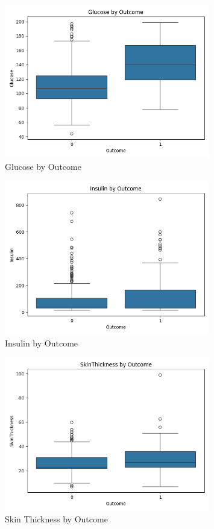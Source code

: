 \documentclass[12pt,a4paper]{article}
\begin{document}
\begin{figure}[H]
\centering
\includegraphics[width=0.8\textwidth]{../plots/boxplot_Glucose.png}
\caption{Glucose by Outcome}
\end{figure}

\begin{figure}[H]
\centering
\includegraphics[width=0.8\textwidth]{../plots/boxplot_Insulin.png}
\caption{Insulin by Outcome}
\end{figure}

\begin{figure}[H]
\centering
\includegraphics[width=0.8\textwidth]{../plots/boxplot_SkinThickness.png}
\caption{Skin Thickness by Outcome}
\end{figure}
\end{document}
